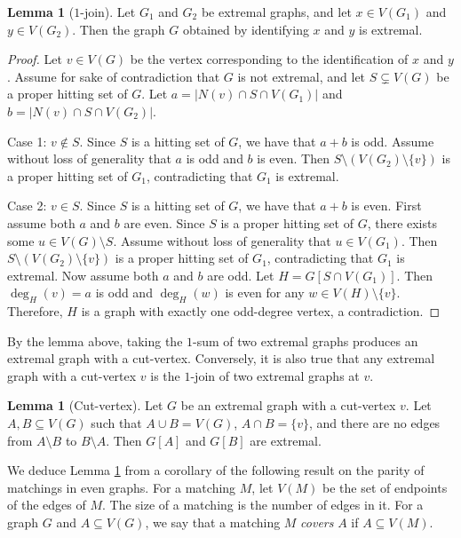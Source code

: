 \documentclass{amsart}
\theoremstyle{definition}
\newtheorem{lemma}[theorem]{Lemma}
\theoremstyle{remark}
\begin{document}
\begin{lemma}[$1$-join]\label{lemma:1sum}
    Let $G_1$ and $G_2$ be extremal graphs, and let $x\in V(G_1)$ and $y \in V(G_2)$. Then the graph $G$ obtained by identifying $x$ and $y$ is extremal.
\end{lemma}
\begin{proof}
    Let $v\in V(G)$ be the vertex corresponding to the identification of $x$ and $y$. Assume for sake of contradiction that $G$ is not extremal, and let $S\subsetneq V(G)$ be a proper hitting set of $G$.  Let $a = |N(v)\cap S\cap V(G_1)|$ and $b = |N(v)\cap S\cap V(G_2)|$. 
    
    Case 1: $v\notin S$. Since $S$ is a hitting set of $G$, we have that $a + b$ is odd. Assume without loss of generality that $a$ is odd and $b$ is even. Then $S\setminus(V(G_2)\setminus\{v\})$ is a proper hitting set of $G_1$, contradicting that $G_1$ is extremal. 
    
    Case 2: $v\in S$. Since $S$ is a hitting set of $G$, we have that $a + b$ is even. First assume both $a$ and $b$ are even. Since $S$ is a proper hitting set of $G$, there exists some $u\in V(G)\setminus S$. Assume without loss of generality that $u\in V(G_1)$. Then $S\setminus(V(G_2)\setminus\{v\})$ is a proper hitting set of $G_1$, contradicting that $G_1$ is extremal. Now assume both $a$ and $b$ are odd. Let $H = G[S\cap V(G_1)]$. Then $\deg_H(v) = a$ is odd and $\deg_H(w)$ is even for any $w\in V(H)\setminus\{v\}$. Therefore, $H$ is a graph with exactly one odd-degree vertex, a contradiction.
\end{proof}

By the lemma above, taking the $1$-sum of two extremal graphs produces an extremal graph with a cut-vertex. Conversely, it is also true that any extremal graph with a cut-vertex $v$ is the $1$-join of two extremal graphs at $v$.

\begin{lemma}[Cut-vertex]\label{lemma:cutvtx}
    Let $G$ be an extremal graph with a cut-vertex $v$. Let $A,B\subseteq V(G)$ such that $A\cup B = V(G)$, $A\cap B = \{v\}$, and there are no edges from $A\setminus B$ to $B\setminus A$. Then $G[A]$ and $G[B]$ are extremal.
\end{lemma}

We deduce Lemma \ref{lemma:cutvtx} from a corollary of the following result on the parity of matchings in even graphs. For a matching $M$, let $V(M)$ be the set of endpoints of the edges of $M$. The size of a matching is the number of edges in it. For a graph $G$ and $A\subseteq V(G)$, we say that a matching $M$ \textit{covers} $A$ if $A\subseteq V(M)$.
\end{document}
